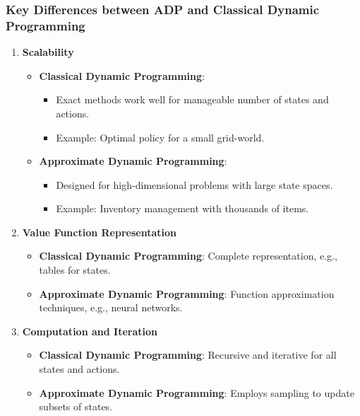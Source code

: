 \documentclass[aspectratio=169]{beamer}
\begin{document}
\begin{frame}[fragile]
    \frametitle{Key Differences between ADP and Classical Dynamic Programming}
    \begin{enumerate}
        \item \textbf{Scalability}
            \begin{itemize}
                \item \textbf{Classical Dynamic Programming}:
                    \begin{itemize}
                        \item Exact methods work well for manageable number of states and actions.
                        \item Example: Optimal policy for a small grid-world.
                    \end{itemize}
                \item \textbf{Approximate Dynamic Programming}:
                    \begin{itemize}
                        \item Designed for high-dimensional problems with large state spaces.
                        \item Example: Inventory management with thousands of items.
                    \end{itemize}
            \end{itemize}
            
        \item \textbf{Value Function Representation}
            \begin{itemize}
                \item \textbf{Classical Dynamic Programming}: Complete representation, e.g., tables for states.
                \item \textbf{Approximate Dynamic Programming}: Function approximation techniques, e.g., neural networks.
            \end{itemize}
        
        \item \textbf{Computation and Iteration}
            \begin{itemize}
                \item \textbf{Classical Dynamic Programming}: Recursive and iterative for all states and actions.
                \item \textbf{Approximate Dynamic Programming}: Employs sampling to update subsets of states.
            \end{itemize}
    \end{enumerate}
\end{frame}
\end{document}
